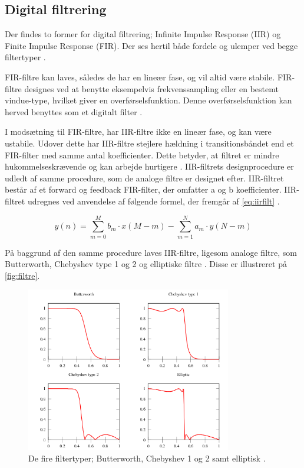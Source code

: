 \subsection{Digital filtrering} \label{sec:teori_filter}
Der findes to former for digital filtrering; Infinite Impulse Response (IIR) og Finite Impulse Response (FIR). Der ses hertil både fordele og ulemper ved begge filtertyper \citep{blandford2012}.

FIR-filtre kan laves, således de har en lineær fase, og vil altid være stabile. 
FIR-filtre designes ved at benytte eksempelvis frekvenssampling eller en bestemt vindue-type, hvilket giver en overførselsfunktion. 
Denne overførselsfunktion kan herved benyttes som et digitalt filter \citep{blandford2012}. 

I modsætning til FIR-filtre, har IIR-filtre ikke en lineær fase, og kan være ustabile. 
Udover dette har IIR-filtre stejlere hældning i transitionsbåndet end et FIR-filter med samme antal koefficienter. 
Dette betyder, at filtret er mindre hukommelseskrævende og kan arbejde hurtigere \citep{blandford2012}. 
IIR-filtrets designprocedure er udledt af samme procedure, som de analoge filtre er designet efter.
IIR-filtret består af et forward og feedback FIR-filter, der omfatter a og b koefficienter. 
IIR-filtret udregnes ved anvendelse af følgende formel, der fremgår af \autoref{eq:iirfilt} \citep{francis2009}. 

\begin{equation} \label{eq:iirfilt}
	y(n)= \sum_{m=0}^{M} b_{m} \cdot x(M-m)- \sum^{N}_{m=1} a_{m} \cdot y(N-m)
\end{equation}

\noindent
På baggrund af den samme procedure laves IIR-filtre, ligesom analoge filtre, som Butterworth, Chebyshev type 1 og 2 og elliptiske filtre \citep{blandford2012}. Disse er illustreret på \autoref{fig:filtre}.

\begin{figure}[H]
\centering
\includegraphics[width=0.8\textwidth]{figures/filtre}
\caption{De fire filtertyper; Butterworth, Chebyshev 1 og 2 samt elliptisk \citep{wikipedia2016}.}
\label{fig:filtre}
\end{figure}


